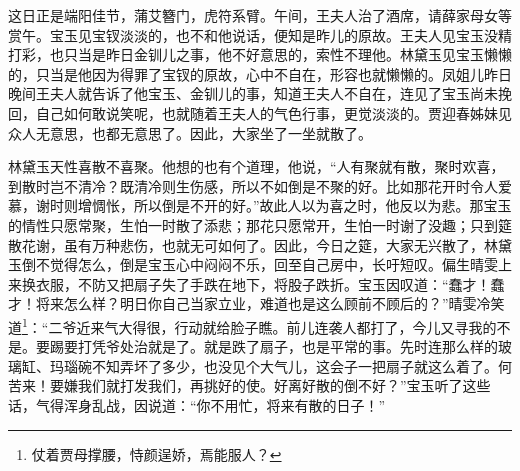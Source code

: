 \documentclass[12pt,oneside]{book}
\begin{document}
这日正是端阳佳节，蒲艾簪门，虎符系臂。午间，王夫人治了酒席，请薛家母女等赏午。宝玉见宝钗淡淡的，也不和他说话，便知是昨儿的原故。王夫人见宝玉没精打彩，也只当是昨日金钏儿之事，他不好意思的，索性不理他。林黛玉见宝玉懒懒的，只当是他因为得罪了宝钗的原故，心中不自在，形容也就懒懒的。凤姐儿昨日晚间王夫人就告诉了他宝玉、金钏儿的事，知道王夫人不自在，连见了宝玉尚未挽回，自己如何敢说笑呢，也就随着王夫人的气色行事，更觉淡淡的。贾迎春姊妹见众人无意思，也都无意思了。因此，大家坐了一坐就散了。

林黛玉天性喜散不喜聚。他想的也有个道理，他说，“人有聚就有散，聚时欢喜，到散时岂不清冷？既清冷则生伤感，所以不如倒是不聚的好。比如那花开时令人爱慕，谢时则增惆怅，所以倒是不开的好。”故此人以为喜之时，他反以为悲。那宝玉的情性只愿常聚，生怕一时散了添悲；那花只愿常开，生怕一时谢了没趣；只到筵散花谢，虽有万种悲伤，也就无可如何了。因此，今日之筵，大家无兴散了，林黛玉倒不觉得怎么，倒是宝玉心中闷闷不乐，回至自己房中，长吁短叹。偏生晴雯上来换衣服，不防又把扇子失了手跌在地下，将股子跌折。宝玉因叹道：“蠢才！蠢才！将来怎么样？明日你自己当家立业，难道也是这么顾前不顾后的？”晴雯冷笑道\footnote{仗着贾母撑腰，恃颜逞娇，焉能服人？}：“二爷近来气大得很，行动就给脸子瞧。前儿连袭人都打了，今儿又寻我的不是。要踢要打凭爷处治就是了。就是跌了扇子，也是平常的事。先时连那么样的玻璃缸、玛瑙碗不知弄坏了多少，也没见个大气儿，这会子一把扇子就这么着了。何苦来！要嫌我们就打发我们，再挑好的使。好离好散的倒不好？”宝玉听了这些话，气得浑身乱战，因说道：“你不用忙，将来有散的日子！”
\end{document}
